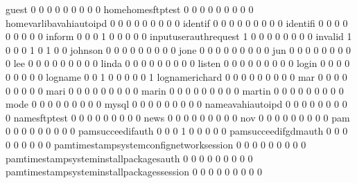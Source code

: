 \documentclass[compress,8pt]{beamer}
\begin{document}
\begin{frame}
\begin{Schunk}
  guest                                      0   0   0   0   0   0   0   0   0
  homehomesftptest                           0   0   0   0   0   0   0   0   0
  homevarlibavahiautoipd                     0   0   0   0   0   0   0   0   0
  identif                                    0   0   0   0   0   0   0   0   0
  identifi                                   0   0   0   0   0   0   0   0   0
  inform                                     0   0   0   1   0   0   0   0   0
  inputuserauthrequest                       1   0   0   0   0   0   0   0   0
  invalid                                    1   0   0   0   1   0   1   0   0
  johnson                                    0   0   0   0   0   0   0   0   0
  jone                                       0   0   0   0   0   0   0   0   0
  jun                                        0   0   0   0   0   0   0   0   0
  lee                                        0   0   0   0   0   0   0   0   0
  linda                                      0   0   0   0   0   0   0   0   0
  listen                                     0   0   0   0   0   0   0   0   0
  login                                      0   0   0   0   0   0   0   0   0
  logname                                    0   0   1   0   0   0   0   0   1
  lognamerichard                             0   0   0   0   0   0   0   0   0
  mar                                        0   0   0   0   0   0   0   0   0
  mari                                       0   0   0   0   0   0   0   0   0
  marin                                      0   0   0   0   0   0   0   0   0
  martin                                     0   0   0   0   0   0   0   0   0
  mode                                       0   0   0   0   0   0   0   0   0
  mysql                                      0   0   0   0   0   0   0   0   0
  nameavahiautoipd                           0   0   0   0   0   0   0   0   0
  namesftptest                               0   0   0   0   0   0   0   0   0
  news                                       0   0   0   0   0   0   0   0   0
  nov                                        0   0   0   0   0   0   0   0   0
  pam                                        0   0   0   0   0   0   0   0   0
  pamsucceedifauth                           0   0   0   1   0   0   0   0   0
  pamsucceedifgdmauth                        0   0   0   0   0   0   0   0   0
  pamtimestampsystemconfignetworksession     0   0   0   0   0   0   0   0   0
  pamtimestampsysteminstallpackagesauth      0   0   0   0   0   0   0   0   0
  pamtimestampsysteminstallpackagessession   0   0   0   0   0   0   0   0   0

\end{Schunk}
\end{frame}
\end{document}
